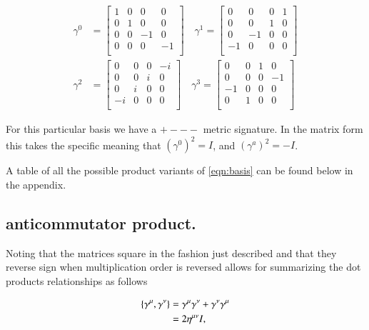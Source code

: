 \begin{align}\label{eqn:basis}
\gamma^0 &= \begin{bmatrix}
 1  &  0  &  0  &  0  \\
 0  &  1  &  0  &  0  \\
 0  &  0  &  -1  &  0  \\
 0  &  0  &  0  &  -1  \\
\end{bmatrix} \quad
\gamma^1 = \begin{bmatrix}
 0  &  0  &  0  &  1  \\
 0  &  0  &  1  &  0  \\
 0  &  -1  &  0  &  0  \\
 -1  &  0  &  0  &  0  \\
\end{bmatrix} \\
\gamma^2 &= \begin{bmatrix}
 0  &  0  &  0  &  -i  \\
 0  &  0  &  i  &  0  \\
 0  &  i  &  0  &  0  \\
 -i  &  0  &  0  &  0  \\
\end{bmatrix}
\quad \gamma^3 = \begin{bmatrix}
 0  &  0  &  1  &  0  \\
 0  &  0  &  0  &  -1  \\
 -1  &  0  &  0  &  0  \\
 0  &  1  &  0  &  0  \\
\end{bmatrix}
\end{align}

For this particular basis we have a $+---$ metric signature.  In the matrix form this takes the specific meaning that $(\gamma^0)^2 = I$, and $(\gamma^a)^2 = -I$.

A table of all the possible product variants of \ref{eqn:basis} can be found below in the appendix.

\subsection{anticommutator product. }

Noting that the matrices square in the fashion just described and that they reverse sign when multiplication order is reversed allows for summarizing the dot products relationships as follows

\begin{align}\label{eqn:symmetric}
{\left\{{\gamma^\mu},{\gamma^\nu}\right\}} 
&= {\gamma^\mu}{\gamma^\nu} + {\gamma^\nu}{\gamma^\mu} \\
&= 2 \eta^{\mu\nu} I,
\end{align}

